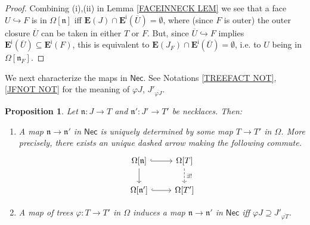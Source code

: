 \documentclass[a4paper,10pt]{article}%
\numberwithin{equation}{section}
\numberwithin{figure}{section}
\newtheorem{proposition}[equation]{Proposition}%
\theoremstyle{definition} %
\begin{document}
\begin{proof}
	Combining (i),(ii) in 
	Lemma \ref{FACEINNECK LEM}
	we see that a face $U \hookrightarrow F$ is
	in $\Omega[\mathfrak{n}]$
	iff $\boldsymbol{E}(J) \cap 
	\boldsymbol{E}^{\mathsf{i}}(\overline{U}) = \emptyset$,
	where (since $F$ is outer) the outer closure $\overline{U}$
	can be taken in either $T$ or $F$.
	But,
	since $\overline{U} \hookrightarrow F$
	implies 
	$\boldsymbol{E}^{\mathsf{i}}(\overline{U})
	\subseteq 
	\boldsymbol{E}^{\mathsf{i}}(F)$,
	this is equivalent to 
	$\boldsymbol{E}(J_F) \cap 
	\boldsymbol{E}^{\mathsf{i}}(\overline{U}) = \emptyset$,
	i.e. to $U$ being in $\Omega[\mathfrak{n}_F]$.
\end{proof}


We next characterize the maps in $\mathsf{Nec}$.
See Notations \ref{TREEFACT NOT}, \ref{JFNOT NOT}
for the meaning of
$\varphi J$,
$J'_{\overline{\varphi J}}$.



\begin{proposition}\label{MAPNECK PROP}
	Let $\mathfrak{n}\colon J \to T$ and $\mathfrak{n}' \colon J' \to T'$ be necklaces. Then:
\begin{enumerate}
\item[(i)]
	A map $\mathfrak{n} \to \mathfrak{n}'$ in $\mathsf{Nec}$
	is uniquely determined by some map 
	$T \to T'$ in $\Omega$. 
	More precisely, there exists an unique dashed arrow
	making the following commute.
\begin{equation}\label{NECKMAP EQ}
\begin{tikzcd}
	\Omega[\mathfrak{n}] 
	\ar[hookrightarrow]{r} 
	\ar{d}
&
	\Omega[T] 
	\ar[dashed]{d}{\exists !}
\\
	\Omega[\mathfrak{n}']
	\ar[hookrightarrow]{r}
&
	\Omega[T']
	\end{tikzcd}
\end{equation}
\item[(ii)]
	A map of trees 
	$\varphi \colon T \to T'$ in $\Omega$
	induces a map 
	$\mathfrak{n} \to \mathfrak{n}'$ in $\mathsf{Nec}$
	iff
	$\varphi J \supseteq J'_{\overline{\varphi T}}$.
\end{enumerate}
\end{proposition}
\end{document}

